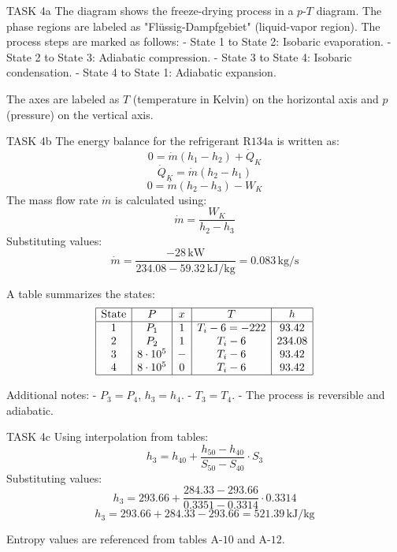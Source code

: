 TASK 4a  
The diagram shows the freeze-drying process in a \( p \)-\( T \) diagram. The phase regions are labeled as "Flüssig-Dampfgebiet" (liquid-vapor region). The process steps are marked as follows:  
- State 1 to State 2: Isobaric evaporation.  
- State 2 to State 3: Adiabatic compression.  
- State 3 to State 4: Isobaric condensation.  
- State 4 to State 1: Adiabatic expansion.  

The axes are labeled as \( T \) (temperature in Kelvin) on the horizontal axis and \( p \) (pressure) on the vertical axis.  

TASK 4b  
The energy balance for the refrigerant \( \text{R134a} \) is written as:  
\[
0 = \dot{m} \left( h_1 - h_2 \right) + \dot{Q}_K
\]
\[
\dot{Q}_K = \dot{m} \left( h_2 - h_1 \right)
\]
\[
0 = \dot{m} \left( h_2 - h_3 \right) - W_K
\]
The mass flow rate \( \dot{m} \) is calculated using:  
\[
\dot{m} = \frac{W_K}{h_2 - h_3}
\]
Substituting values:  
\[
\dot{m} = \frac{-28 \, \text{kW}}{234.08 - 59.32 \, \text{kJ/kg}} = 0.083 \, \text{kg/s}
\]

A table summarizes the states:  
\[
\begin{array}{|c|c|c|c|c|}
\hline
\text{State} & P & x & T & h \\
\hline
1 & P_1 & 1 & T_i - 6 = -222 & 93.42 \\
2 & P_2 & 1 & T_i - 6 & 234.08 \\
3 & 8 \cdot 10^5 & - & T_i - 6 & 93.42 \\
4 & 8 \cdot 10^5 & 0 & T_i - 6 & 93.42 \\
\hline
\end{array}
\]

Additional notes:  
- \( P_3 = P_4 \), \( h_3 = h_4 \).  
- \( T_3 = T_4 \).  
- The process is reversible and adiabatic.  

TASK 4c  
Using interpolation from tables:  
\[
h_3 = h_{40} + \frac{h_{50} - h_{40}}{S_{50} - S_{40}} \cdot S_3
\]
Substituting values:  
\[
h_3 = 293.66 + \frac{284.33 - 293.66}{0.3351 - 0.3314} \cdot 0.3314
\]
\[
h_3 = 293.66 + 284.33 - 293.66 = 521.39 \, \text{kJ/kg}
\]  

Entropy values are referenced from tables \( \text{A-10} \) and \( \text{A-12} \).